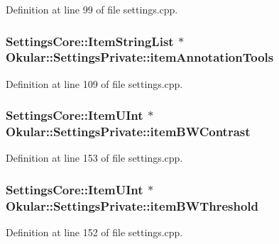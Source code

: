 Definition at line 99 of file settings.\+cpp.

\hypertarget{classOkular_1_1SettingsPrivate_a7e00c8908af893f273be9102ad3c6b73}{
\subsubsection[{item\+Annotation\+Tools}]{\setlength{\rightskip}{0pt plus 5cm}Settings\+Core\+::\+Item\+String\+List $\ast$ Okular\+::\+Settings\+Private\+::item\+Annotation\+Tools}}\label{classOkular_1_1SettingsPrivate_a7e00c8908af893f273be9102ad3c6b73}


Definition at line 109 of file settings.\+cpp.

\hypertarget{classOkular_1_1SettingsPrivate_ab07751ab5f10de8ca8f842447a45a2cd}{
\subsubsection[{item\+B\+W\+Contrast}]{\setlength{\rightskip}{0pt plus 5cm}Settings\+Core\+::\+Item\+U\+Int $\ast$ Okular\+::\+Settings\+Private\+::item\+B\+W\+Contrast}}\label{classOkular_1_1SettingsPrivate_ab07751ab5f10de8ca8f842447a45a2cd}


Definition at line 153 of file settings.\+cpp.

\hypertarget{classOkular_1_1SettingsPrivate_ad54cedc7f9a8f1fcf4bac28c00af0e0f}{
\subsubsection[{item\+B\+W\+Threshold}]{\setlength{\rightskip}{0pt plus 5cm}Settings\+Core\+::\+Item\+U\+Int $\ast$ Okular\+::\+Settings\+Private\+::item\+B\+W\+Threshold}}\label{classOkular_1_1SettingsPrivate_ad54cedc7f9a8f1fcf4bac28c00af0e0f}


Definition at line 152 of file settings.\+cpp.

